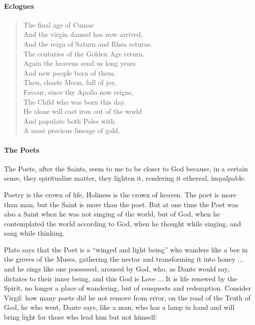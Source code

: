 \paragraph{Eclogues}
\begin{verse}
The final age of Cumae\\
And the virgin damsel has now arrived,\\
And the reign of Saturn and Rhea returns.\\
The centuries of the Golden Age return.\\
Again the heavens send us long years\\
And new people born of them.\\
Thou, chaste Moon, full of joy,\\
Favour, since thy Apollo now reigns,\\
The Child who was born this day.\\
He alone will cast iron out of the world\\
And populate both Poles with\\
A most precious lineage of gold.
\end{verse}

\paragraph{The Poets}


The Poets, after the Saints, seem to me to be closer to God because, in a certain sense, they spiritualize matter, they lighten it, rendering it ethereal, impalpable.

Poetry is the crown of life, Holiness is the crown of heaven. The poet is more than man, but the Saint is more than the poet. But at one time the Poet was also a Saint when he was not singing of the world, but of God, when he contemplated the world according to God, when he thought while singing, and sang while thinking.

Plato says that the Poet is a ``winged and light being'' who wanders like a bee in the groves of the Muses, gathering the nectar and transforming it into honey ... and he sings like one possessed, aroused by God, who, as Dante would say, dictates to their inner being, and this God is Love ... It is life renewed by the Spirit, no longer a place of wandering, but of conquests and redemption. Consider Virgil: how many poets did he not remove from error, on the road of the Truth of God, he who went, Dante says, like a man, who has a lamp in hand and will bring light for those who lead him but not himself:

